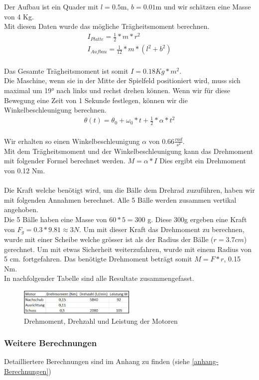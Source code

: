 Der Aufbau ist ein Quader mit $l=0.5$m, $b=0.01$m und wir schätzen eine Masse von 4 Kg.\\
Mit diesen Daten wurde das mögliche Trägheitsmoment berechnen.\\
\begin{gather}
	I_{Platte}=\frac{1}{2}*m*r^2 \\
	I_{Aufbau}=\frac{1}{12}*m*(l^2+b^2)
\end{gather}\\
Das Gesamte Trägheitsmoment ist somit $I=0.18 Kg*m^2$.\\
Die Maschine, wenn sie in der Mitte der Spielfeld positioniert wird, muss sich maximal um 19° nach links und rechst drehen können. Wenn wir für diese Bewegung eine Zeit von 1 Sekunde festlegen, können wir die Winkelbeschleunigung berechnen. \\
\begin{gather}
	\theta(t)=\theta_0+\omega_0*t+\frac{1}{2}*\alpha*t^2
\end{gather}\\
Wir erhalten so einen Winkelbeschleunigung $\alpha$ von 0.66$\frac{rad}{s^2}$.\\
Mit dem Trägheitsmoment und der Winkelbeschleunigung kann das Drehmoment mit folgender Formel berechnet werden. $M=\alpha*I$ Dies ergibt ein Drehmoment von 0.12 Nm.\\ \\
Die Kraft welche benötigt wird, um die Bälle dem Drehrad zuzuführen, haben wir mit folgenden Annahmen berechnet. Alle 5 Bälle werden zusammen vertikal angehoben.\\
Die 5 Bälle haben eine Masse von $60*5=300$ g. Diese 300g ergeben eine Kraft von  $F_g=0.3*9.81\approx3 N$. Um mit dieser Kraft das Drehmoment zu berechnen, wurde mit einer Scheibe welche grösser ist als der Radius der Bälle ($r=3.7cm$) gerechnet. Um mit etwas Sicherheit weiterzufahren, wurde mit einem Radius von 5 cm. fortgefahren. Das benötigte Drehmoment beträgt somit $M=F*r$, 0.15 Nm.\\
In nachfolgender Tabelle sind alle Resultate zusammengefasst.\\
\begin{figure}[h!]
	\center
	\includegraphics[width=0.5\textwidth]{../../fig/Tabelle_Drehmomente.jpg}
	\caption{Drehmoment, Drehzahl und Leistung der Motoren}
	\label{fig:Drehmoment}
\end{figure} 
\newpage


\subsubsection{Weitere Berechnungen}
Detailliertere Berechnungen sind im Anhang zu finden (siehe \ref{anhang-Berechnungen})